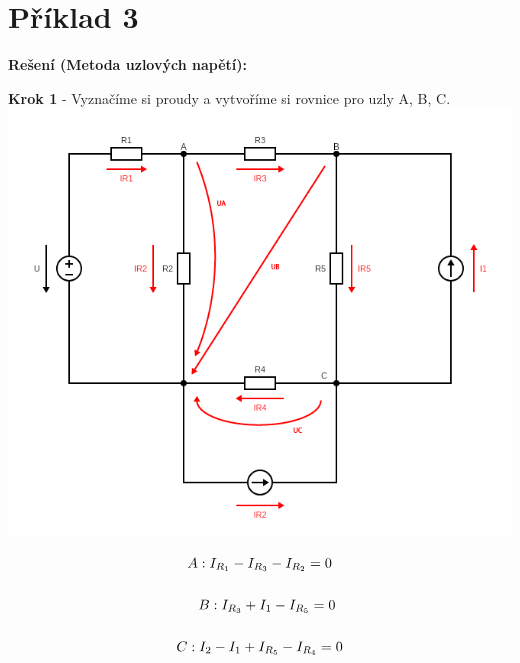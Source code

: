 \section{Příklad 3}

\vspace{1cm}
\large{\textbf{Rešení (Metoda uzlových napětí):}}
\vspace{0.5cm}

\begin{center}
\textbf{Krok 1} - Vyznačíme si proudy a vytvoříme si rovnice pro uzly A, B, C. \\
\includegraphics[scale=0.35,keepaspectratio]{fig/Pr3_steps/Pr3_step01.png}
\end{center}
\vspace{-0.5cm}

\begin{gather*}
A: I_{R_1} - I_{R_3} - I_{R_2} = 0 \\\\
\newline
\newline
B: I_{R_3} + I_1 - I_{R_5} = 0 \\\\
\newline
\newline
C: I_2 - I_1 + I_{R_5} - I_{R_4} = 0
\end{gather*}

\newpage

